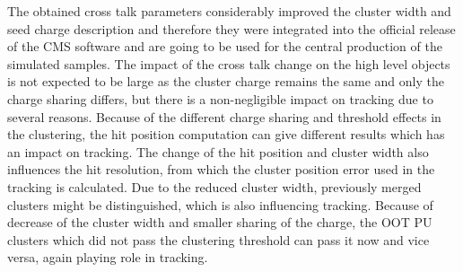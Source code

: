 The obtained cross talk parameters considerably improved the cluster width and seed charge description and therefore they were integrated into the official release of the CMS software and are going to be used for the central production of the simulated samples. The impact of the cross talk change on the high level objects is not expected to be large as the cluster charge remains the same and only the charge sharing differs, but there is a non-negligible impact on tracking due to several reasons. Because of the different charge sharing and threshold effects in the clustering, the hit position computation can give different results which has an impact on tracking. The change of the hit position and cluster width also influences the hit resolution, from which the cluster position error used in the tracking is calculated. Due to the reduced cluster width, previously merged clusters might be distinguished, which is also influencing tracking. Because of decrease of the cluster width and smaller sharing of the charge, the OOT PU clusters which did not pass the clustering threshold can pass it now and vice versa, again playing role in tracking.   





